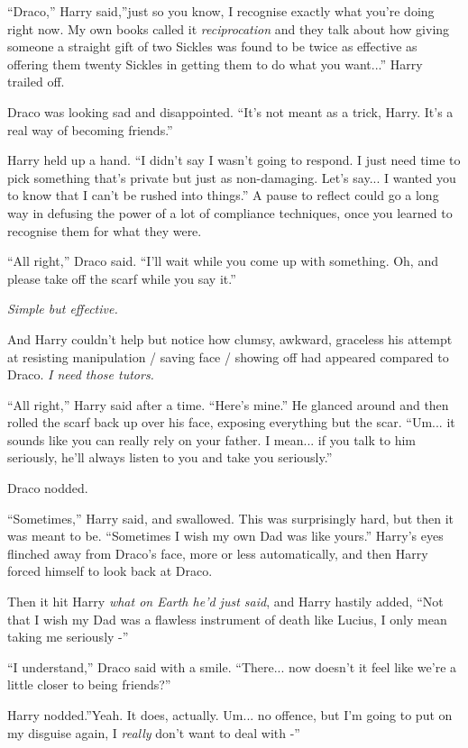 ``Draco,'' Harry said,''just so you know, I recognise exactly what
you're doing right now. My own books called it \emph{reciprocation} and
they talk about how giving someone a straight gift of two Sickles was
found to be twice as effective as offering them twenty Sickles in
getting them to do what you want...'' Harry trailed off.

Draco was looking sad and disappointed. ``It's not meant as a trick,
Harry. It's a real way of becoming friends.''

Harry held up a hand. ``I didn't say I wasn't going to respond. I just
need time to pick something that's private but just as non-damaging.
Let's say... I wanted you to know that I can't be rushed into
things.'' A pause to reflect could go a long way in defusing the power
of a lot of compliance techniques, once you learned to recognise them
for what they were.

``All right,'' Draco said. ``I'll wait while you come up with something.
Oh, and please take off the scarf while you say it.''

\emph{Simple but effective.}

And Harry couldn't help but notice how clumsy, awkward, graceless his
attempt at resisting manipulation / saving face / showing off had
appeared compared to Draco. \emph{I need those tutors.}

``All right,'' Harry said after a time. ``Here's mine.'' He glanced
around and then rolled the scarf back up over his face, exposing
everything but the scar. ``Um... it sounds like you can really rely
on your father. I mean... if you talk to him seriously, he'll
always listen to you and take you seriously.''

Draco nodded.

``Sometimes,'' Harry said, and swallowed. This was surprisingly hard,
but then it was meant to be. ``Sometimes I wish my own Dad was like
yours.'' Harry's eyes flinched away from Draco's face, more or less
automatically, and then Harry forced himself to look back at Draco.

Then it hit Harry \emph{what on Earth he'd just said}, and Harry hastily
added, ``Not that I wish my Dad was a flawless instrument of death like
Lucius, I only mean taking me seriously -''

``I understand,'' Draco said with a smile. ``There... now doesn't
it feel like we're a little closer to being friends?''

Harry nodded.''Yeah. It does, actually. Um... no offence, but I'm
going to put on my disguise again, I \emph{really} don't want to deal
with -''

